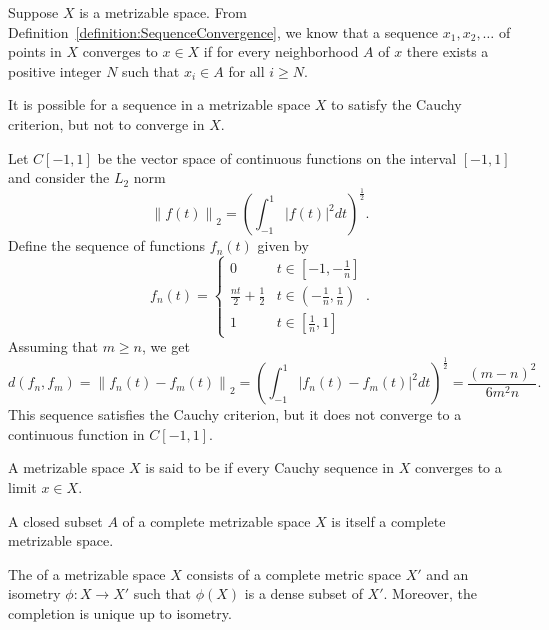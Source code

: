 Suppose $X$ is a metrizable space.
From Definition~\ref{definition:SequenceConvergence}, we know that a sequence $x_1, x_2, \ldots$ of points in $X$ converges to $x \in X$ if for every neighborhood $A$ of $x$ there exists a positive integer $N$ such that $x_i \in A$ for all $i \geq N$.

It is possible for a sequence in a metrizable space $X$ to satisfy the Cauchy criterion, but not to converge in $X$.

\begin{example}
Let $C[-1,1]$ be the vector space of continuous functions on the interval $[-1,1]$ and consider the $L_2$ norm
\begin{equation*}
\left\| f(t) \right\|_2 = \left( \int_{-1}^1 |f(t)|^2 dt \right)^{\frac{1}{2}}.
\end{equation*}
Define the sequence of functions $f_n(t)$ given by
\begin{equation*}
f_n(t) = \left\{ \begin{array}{ll}
0 & t \in \left[ -1, -\frac{1}{n} \right] \\
\frac{nt}{2} + \frac{1}{2} & t \in \left( -\frac{1}{n}, \frac{1}{n} \right) \\
1 & t \in \left[ \frac{1}{n}, 1 \right]
\end{array} \right. .
\end{equation*}
Assuming that $m \geq n$, we get
\begin{equation*}
d(f_n, f_m) = \left\| f_n(t) - f_m(t) \right\|_2
= \left( \int_{-1}^1 |f_n(t) - f_m(t)|^2 dt \right)^{\frac{1}{2}}
= \frac{(m-n)^2}{6m^2n}.
\end{equation*}
This sequence satisfies the Cauchy criterion, but it does not converge to a continuous function in $C[-1,1]$.
\end{example}

\begin{definition}
A metrizable space $X$ is said to be  if every Cauchy sequence in $X$ converges to a limit $x \in X$.
\end{definition}

\begin{theorem}
A closed subset $A$ of a complete metrizable space $X$ is itself a complete metrizable space.
\end{theorem}

\begin{definition}
The  of a metrizable space $X$ consists of a complete metric space $X'$ and an isometry $\phi : X \rightarrow X'$ such that $\phi(X)$ is a dense subset of $X'$.
Moreover, the completion is unique up to isometry.
\end{definition}

